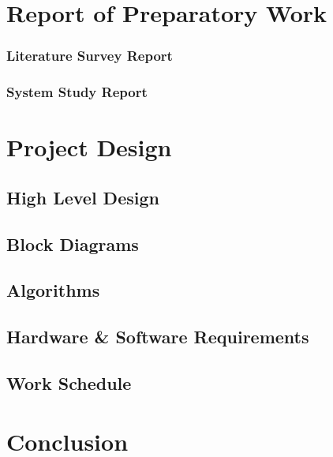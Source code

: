 \documentclass[11pt]{report}
\begin{document}
\chapter{\label{work}Report of Preparatory Work }
\subsection{Literature Survey Report}
\subsection{System Study Report}



\chapter{Project Design}
 \label{xx}

\section{High Level Design}
\section{Block Diagrams}


\section{Algorithms}

\section{Hardware \& Software Requirements}
\section{Work Schedule}


 \chapter{Conclusion}
 \label {con}


 
\end{document}
